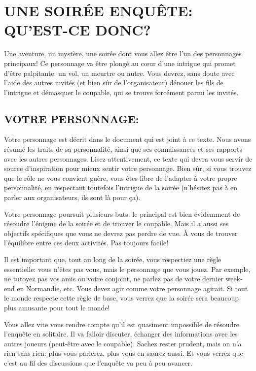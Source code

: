 \documentclass[14pt,twocolumn]{extarticle}
\begin{document}
\section{UNE SOIRÉE ENQUÊTE: QU'EST-CE DONC?}

Une aventure, un mystère, une soirée dont vous allez être l'un des personnages
principaux! Ce personnage va être plongé au cœur d'une intrigue qui promet
d'être palpitante: un vol, un meurtre ou autre. Vous devrez, sans doute avec
l'aide des autres invités (et bien sûr de l'organisateur) dénouer les fils de
l'intrigue et démasquer le coupable, qui se trouve forcément parmi les invités.

\subsection{VOTRE PERSONNAGE:}

Votre personnage est décrit dans le document qui est joint à ce texte. Nous
avons résumé les traits de sa personnalité, ainsi que ses connaissances et ses
rapports avec les autres personnages. Lisez attentivement, ce texte qui devra
vous servir de source d'inspiration pour mieux \og sentir\fg{} votre
personnage.
Bien sûr, si vous trouvez que le rôle ne vous convient guère, vous êtes libre
de l'adapter à votre propre personnalité, en respectant toutefois l'intrigue
de la soirée (n'hésitez pas à en parler aux organisateurs, ils sont là pour
ça).

Votre personnage poursuit plusieurs buts: le principal est bien évidemment de
résoudre l'énigme de la soirée et de trouver le coupable. Mais il a aussi ses
objectifs spécifiques que vous ne devrez pas perdre de vue. À vous de trouver
l'équilibre entre ces deux activités. Pas toujours facile!

Il est important que, tout au long de la soirée, vous respectiez une règle
essentielle: vous n'êtes pas vous, mais le personnage que vous jouez. Par
exemple, ne tutoyez pas vos amis ou votre conjoint, ne parlez pas de votre
dernier week-end en Normandie, etc. Vous devez agir comme votre personnage
agirait. Si tout le monde respecte cette règle de base, vous verrez que la
soirée sera beaucoup plus amusante pour tout le monde!

Vous allez vite vous rendre compte qu'il est quasiment impossible de résoudre
l'enquête en solitaire. Il va falloir discuter, échanger des informations avec
les autres joueurs (peut-être avec le coupable). Sachez rester prudent, mais on
n'a rien sans rien: plus vous parlerez, plus vous en saurez aussi. Et vous
verrez que c'est au fil des discussions que l'enquête va peu à peu avancer.
\end{document}
